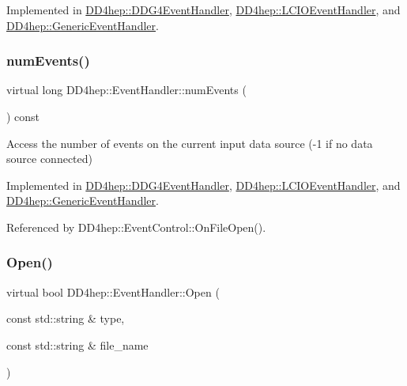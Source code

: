Implemented in \hyperlink{class_d_d4hep_1_1_d_d_g4_event_handler_a02ecd0dfced58988ab84242cb9fdfd44}{D\+D4hep\+::\+D\+D\+G4\+Event\+Handler}, \hyperlink{class_d_d4hep_1_1_l_c_i_o_event_handler_a14966ef5f33d58b1f0f3b952a334d48f}{D\+D4hep\+::\+L\+C\+I\+O\+Event\+Handler}, and \hyperlink{class_d_d4hep_1_1_generic_event_handler_a0dc8d4d5dde63d3278f67da79e86b590}{D\+D4hep\+::\+Generic\+Event\+Handler}.

\hypertarget{class_d_d4hep_1_1_event_handler_a005436bba029439b513645485e3c0ff5}{}\label{class_d_d4hep_1_1_event_handler_a005436bba029439b513645485e3c0ff5} 
\subsubsection{\texorpdfstring{num\+Events()}{numEvents()}}
{\footnotesize\ttfamily virtual long D\+D4hep\+::\+Event\+Handler\+::num\+Events (\begin{DoxyParamCaption}{ }\end{DoxyParamCaption}) const\hspace{0.3cm}{\ttfamily [pure virtual]}}



Access the number of events on the current input data source (-\/1 if no data source connected) 



Implemented in \hyperlink{class_d_d4hep_1_1_d_d_g4_event_handler_af8ae7a5a68752fa17aa83ab9f0a952fe}{D\+D4hep\+::\+D\+D\+G4\+Event\+Handler}, \hyperlink{class_d_d4hep_1_1_l_c_i_o_event_handler_a9fb0b8033c171dc3a41eab1a439547e8}{D\+D4hep\+::\+L\+C\+I\+O\+Event\+Handler}, and \hyperlink{class_d_d4hep_1_1_generic_event_handler_a05d0623b58211c6d941aea1377771a2b}{D\+D4hep\+::\+Generic\+Event\+Handler}.



Referenced by D\+D4hep\+::\+Event\+Control\+::\+On\+File\+Open().

\hypertarget{class_d_d4hep_1_1_event_handler_a90995d3b610beee9d9f7fafcc060626b}{}\label{class_d_d4hep_1_1_event_handler_a90995d3b610beee9d9f7fafcc060626b} 
\subsubsection{\texorpdfstring{Open()}{Open()}}
{\footnotesize\ttfamily virtual bool D\+D4hep\+::\+Event\+Handler\+::\+Open (\begin{DoxyParamCaption}\item[{const std\+::string \&}]{type,  }\item[{const std\+::string \&}]{file\+\_\+name }\end{DoxyParamCaption})\hspace{0.3cm}{\ttfamily [pure virtual]}}



